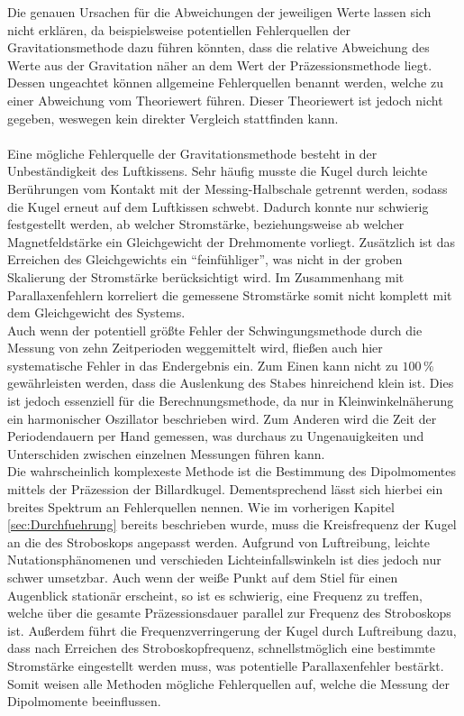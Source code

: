 Die genauen Ursachen für die Abweichungen der jeweiligen Werte lassen sich nicht erklären, da beispielsweise 
potentiellen Fehlerquellen der Gravitationsmethode dazu führen könnten, dass die relative Abweichung des Werte aus der 
Gravitation näher an dem Wert der Präzessionsmethode liegt. \\
Dessen ungeachtet können allgemeine Fehlerquellen benannt werden, welche zu einer Abweichung vom Theoriewert führen. Dieser 
Theoriewert ist jedoch nicht gegeben, weswegen kein direkter Vergleich stattfinden kann.\\\\
Eine mögliche Fehlerquelle der Gravitationsmethode besteht in der Unbeständigkeit des Luftkissens. Sehr häufig musste 
die Kugel durch leichte Berührungen vom Kontakt mit der Messing-Halbschale getrennt werden, sodass die Kugel erneut 
auf dem Luftkissen schwebt. Dadurch konnte nur schwierig festgestellt werden, ab welcher Stromstärke, beziehungsweise ab 
welcher Magnetfeldstärke ein Gleichgewicht der Drehmomente vorliegt. Zusätzlich ist das Erreichen des Gleichgewichts 
ein \enquote{feinfühliger}, was nicht in der groben Skalierung der Stromstärke berücksichtigt wird. Im Zusammenhang 
mit Parallaxenfehlern korreliert die gemessene Stromstärke somit nicht komplett mit dem Gleichgewicht des Systems.\\
Auch wenn der potentiell größte Fehler der Schwingungsmethode durch die Messung von zehn Zeitperioden weggemittelt wird,
fließen auch hier systematische Fehler in das Endergebnis ein. Zum Einen kann nicht zu $100\,\unit{\percent}$ 
gewährleisten werden, dass die Auslenkung des Stabes hinreichend klein ist. Dies ist jedoch essenziell für die 
Berechnungsmethode, da nur in Kleinwinkelnäherung ein harmonischer Oszillator beschrieben wird. Zum Anderen wird die Zeit 
der Periodendauern per Hand gemessen, was durchaus zu Ungenauigkeiten und Unterschiden zwischen einzelnen Messungen 
führen kann. \\
Die wahrscheinlich komplexeste Methode ist die Bestimmung des Dipolmomentes mittels der Präzession der Billardkugel.
Dementsprechend lässt sich hierbei ein breites Spektrum an Fehlerquellen nennen. Wie im vorherigen Kapitel \ref{sec:Durchfuehrung}
bereits beschrieben wurde, muss die Kreisfrequenz der Kugel an die des Stroboskops angepasst werden. Aufgrund von Luftreibung,
leichte Nutationsphänomenen und verschieden Lichteinfallswinkeln ist dies jedoch nur schwer umsetzbar. Auch wenn der weiße
Punkt auf dem Stiel für einen Augenblick stationär erscheint, so ist es schwierig, eine Frequenz zu treffen, welche über 
die gesamte Präzessionsdauer parallel zur Frequenz des Stroboskops ist. Außerdem führt die Frequenzverringerung der Kugel 
durch Luftreibung dazu, dass nach Erreichen des Stroboskopfrequenz, schnellstmöglich eine bestimmte Stromstärke eingestellt werden 
muss, was potentielle Parallaxenfehler bestärkt. \\
Somit weisen alle Methoden mögliche Fehlerquellen auf, welche die Messung der Dipolmomente beeinflussen.

